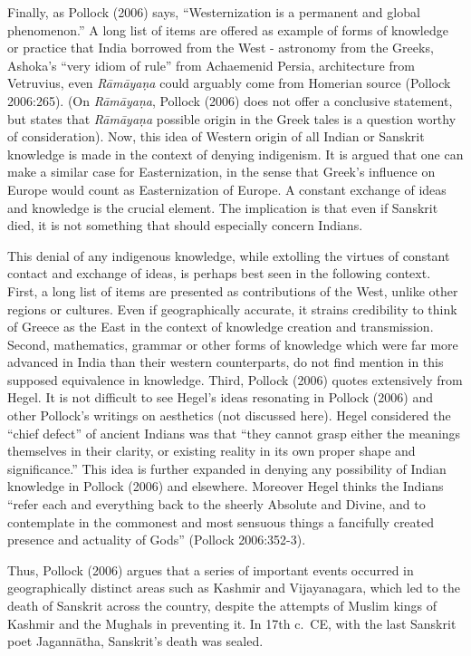 Finally, as Pollock (2006) says, “Westernization is a permanent and global phenomenon.” A long list of items are offered as example of forms of knowledge or practice that India borrowed from the West - astronomy from the Greeks, Ashoka’s “very idiom of rule” from  Achaemenid Persia, architecture from Vetruvius, even {\sl Rāmāyaṇa} could arguably come from Homerian source (Pollock 2006:265). (On  {\sl Rāmāyaṇa}, Pollock (2006) does not offer a conclusive statement, but states that {\sl Rāmāyaṇa} possible origin in the Greek tales is a question worthy of consideration). Now, this idea of Western origin of all Indian or Sanskrit knowledge is made in the context of denying indigenism. It is argued that one can make a similar case for Easternization, in the sense that Greek’s influence on Europe would count as Easternization of Europe. A constant exchange of ideas and knowledge is the crucial element. The implication is that even if Sanskrit died, it is not something that should especially concern Indians.

This denial of any indigenous knowledge, while extolling the virtues of constant contact and exchange of ideas, is perhaps best seen in the following context. First, a long list of items are presented as contributions of the West, unlike other regions or cultures. Even if geographically accurate, it strains credibility to think of Greece as the East in the context of knowledge creation and transmission. Second, mathematics, grammar or other forms of knowledge which were far more advanced in India than their western counterparts, do not find mention in this supposed equivalence in knowledge. Third, Pollock (2006) quotes extensively from Hegel. It is not difficult to see Hegel’s ideas resonating in Pollock (2006) and other Pollock’s writings on aesthetics (not discussed here). Hegel considered the “chief defect” of ancient Indians was that “they cannot grasp either the meanings themselves in their clarity, or existing reality in its own proper shape and significance.” This idea is further expanded in denying any possibility of Indian knowledge in Pollock (2006) and elsewhere. Moreover Hegel thinks the Indians “refer each and everything back to the sheerly Absolute and Divine, and to contemplate in the commonest and most sensuous things a fancifully created presence and actuality of Gods” (Pollock 2006:352-3).

Thus, Pollock (2006) argues that a series of important events occurred in geographically distinct areas such as Kashmir and Vijayanagara, which led to the death of Sanskrit across the country, despite the attempts of Muslim kings of Kashmir and the Mughals in preventing it. In 17th c.\ CE, with the last Sanskrit poet Jagannātha, Sanskrit’s death was sealed.

